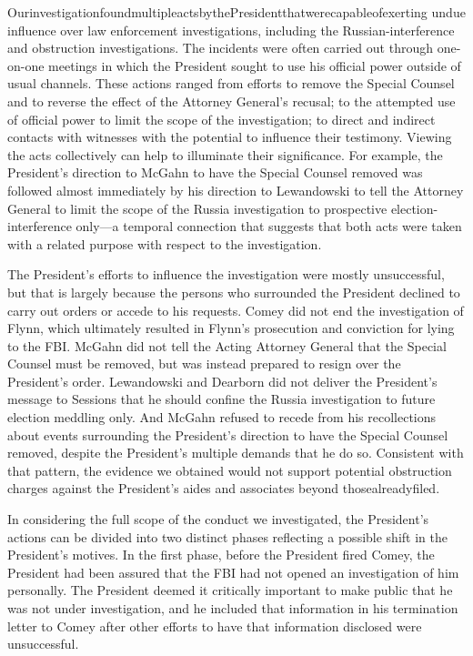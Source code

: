 {OurinvestigationfoundmultipleactsbythePresidentthatwerecapableofexerting undue influence over law enforcement investigations, including the Russian-interference and obstruction investigations. The incidents were often carried out through one-on-one meetings in which the President sought to use his official power outside of usual channels. These actions ranged from efforts to remove the Special Counsel and to reverse the effect of the Attorney General's recusal; to the attempted use of official power to limit the scope of the investigation; to direct and indirect contacts with witnesses with the potential to influence their testimony. Viewing
the acts collectively can help to illuminate their significance. For example, the President's direction to McGahn to have the Special Counsel removed was followed almost immediately by his direction to Lewandowski to tell the Attorney General to limit the scope of the Russia investigation to prospective election-interference only—a temporal connection that suggests that both acts were taken with a related purpose with respect to the investigation.

The President's efforts to influence the investigation were mostly unsuccessful, but that is largely because the persons who surrounded the President declined to carry out orders or accede to his requests. Comey did not end the investigation of Flynn, which ultimately resulted in Flynn's prosecution and conviction for lying to the FBI. McGahn did not tell the Acting Attorney General that the Special Counsel must be removed, but was instead prepared to resign over the President's order. Lewandowski and Dearborn did not deliver the President's message to Sessions that he should confine the Russia investigation to future election meddling only. And McGahn refused to recede from his recollections about events surrounding the President's direction to have the Special Counsel removed, despite the President's multiple demands that he do so. Consistent with that pattern, the evidence we obtained would not support potential obstruction charges against the President's aides and associates beyond thosealreadyfiled.

In considering the full scope of the conduct we investigated, the President's actions can be divided into two distinct phases reflecting a possible shift in the President's motives. In the first phase, before the President fired Comey, the President had been assured that the FBI had not opened an investigation of him personally. The President deemed it critically important to make public that he was not under investigation, and he included that information in his termination letter to Comey after other efforts to have that information disclosed were unsuccessful.

}
